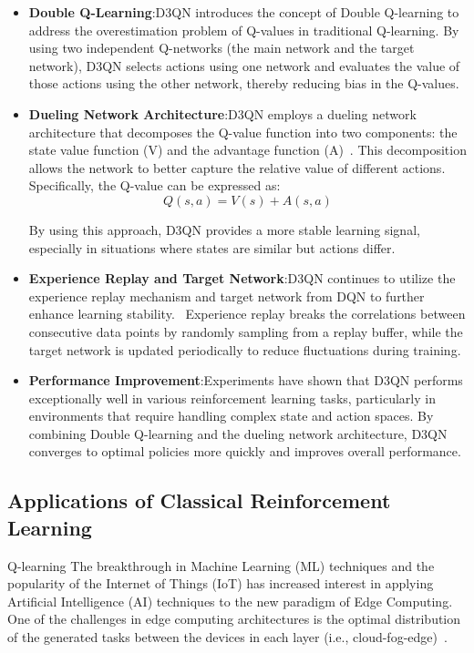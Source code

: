 \documentclass[journal]{IEEEtran}
\begin{document}
\begin{itemize}
\item \textbf{Double Q-Learning}:D3QN introduces the concept of Double Q-learning to address the overestimation problem of Q-values in traditional Q-learning. By using two independent Q-networks (the main network and the target network), D3QN selects actions using one network and evaluates the value of those actions using the other network, thereby reducing bias in the Q-values.
\item \textbf{Dueling Network Architecture}:D3QN employs a dueling network architecture that decomposes the Q-value function into two components: the state value function (V) and the advantage function (A)~\cite{pyyz002}. This decomposition allows the network to better capture the relative value of different actions. Specifically, the Q-value can be expressed as: \begin{equation}
    \mathit{Q}(s, a) = \mathit{V}(s) + \mathit{A}(s, a)
\end{equation}

By using this approach, D3QN provides a more stable learning signal, especially in situations where states are similar but actions differ.
\item \textbf{Experience Replay and Target Network}:D3QN continues to utilize the experience replay mechanism and target network from DQN to further enhance learning stability. ~\cite{pyyz003}Experience replay breaks the correlations between consecutive data points by randomly sampling from a replay buffer, while the target network is updated periodically to reduce fluctuations during training.
\item \textbf{Performance Improvement}:Experiments have shown that D3QN performs exceptionally well in various reinforcement learning tasks, particularly in environments that require handling complex state and action spaces. By combining Double Q-learning and the dueling network architecture, D3QN converges to optimal policies more quickly and improves overall performance.
\end{itemize}

\subsection{Applications of Classical Reinforcement Learning}
Q-learning The breakthrough in Machine Learning (ML) techniques and the popularity of the Internet of Things (IoT) has increased interest in applying Artificial Intelligence (AI) techniques to the new paradigm of Edge Computing. One of the challenges in edge computing architectures is the optimal distribution of the generated tasks between the devices in each layer (i.e., cloud-fog-edge)~\cite{pyyz004}.
\end{document}
